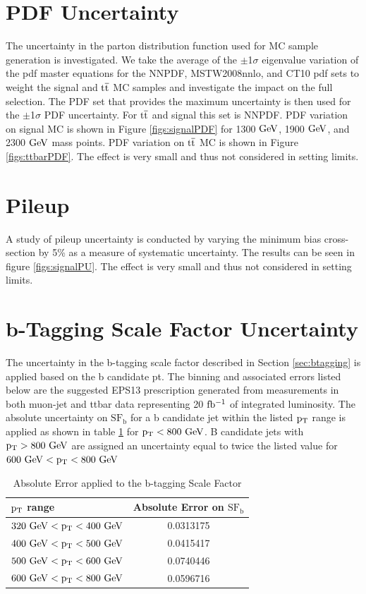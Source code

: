 \section{PDF Uncertainty}
The uncertainty in the parton distribution function used for MC sample generation is investigated.  We take the average of the $\pm$1$\sigma$ eigenvalue 
variation of the pdf master equations \cite{Bourilkov:2006cj} 
for the NNPDF, MSTW2008nnlo, and CT10 pdf sets to weight the signal and $\mathrm{t\overline{t}}$ MC samples and investigate the impact on the full selection.  The PDF set 
that provides the maximum uncertainty is then used for the $\pm$1$\sigma$ PDF uncertainty.  For $\mathrm{t\overline{t}}$ and signal this set is NNPDF. PDF 
variation on signal MC is shown in Figure \ref{figs:signalPDF} for 1300$~\mathrm{GeV}$,
 1900$~\mathrm{GeV}$, and 2300$~\mathrm{GeV}$ mass points.  PDF variation on $\mathrm{t\overline{t}}$ MC is shown in Figure \ref{figs:ttbarPDF}.  The effect is very small and thus not considered in setting limits.

\section{Pileup}
A study of pileup uncertainty is conducted by varying the minimum bias cross-section by 5\% as a measure of systematic uncertainty.  The results 
can be seen in figure \ref{figs:signalPU}.  The effect is very small and thus not considered in setting limits.

\section{b-Tagging Scale Factor Uncertainty}
\label{sec:btagunc}
The uncertainty in the b-tagging scale factor described in Section \ref{sec:btagging} is applied based on the b candidate pt.  The binning and associated errors 
listed below are the suggested EPS13 prescription generated from measurements in both muon-jet and ttbar data representing 20$~\mathrm{fb^{-1}}$ of integrated 
luminosity.  The absolute uncertainty on $\mathrm{SF_b}$ for a b candidate jet within the listed $\mathrm{p_{T}}$ range is applied as shown in table \ref{table:btaggingerrors} 
for $\mathrm{p_{T}} < 800~\mathrm{GeV}$.  B candidate jets with $\mathrm{p_{T}} > 800~\mathrm{GeV}$ are assigned an uncertainty equal to twice the listed value for $600~\mathrm{GeV} < \mathrm{p_{T}} < 800~\mathrm{GeV}$

\begin{table}
\begin{center}
\begin{tabular}{l|c} 
\hline\hline
\bf{$\mathrm{p_{T}}$ range } & \bf{Absolute Error on $\mathrm{SF_b}$} \\
\hline\hline
$320~\mathrm{GeV} < \mathrm{p_{T}} < 400~\mathrm{GeV}$ & 0.0313175 \\
$400~\mathrm{GeV} < \mathrm{p_{T}} < 500~\mathrm{GeV}$ & 0.0415417 \\
$500~\mathrm{GeV} < \mathrm{p_{T}} < 600~\mathrm{GeV}$ & 0.0740446 \\
$600~\mathrm{GeV} < \mathrm{p_{T}} < 800~\mathrm{GeV}$ & 0.0596716 \\
\hline
\end{tabular}
\end{center}
\caption{Absolute Error applied to the b-tagging Scale Factor}
\label{table:btaggingerrors}
\end{table}



